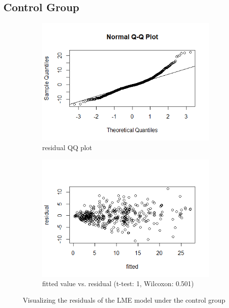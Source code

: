 \subsection{Control Group}
\begin{figure}[H]
\centering
\begin{subfigure}{.4\textwidth}
  \centering
  \includegraphics[width=1\linewidth]{../../plots/qq_residual_control.png}
  \caption{residual QQ plot}
\end{subfigure}
\begin{subfigure}{.4\textwidth}
  \centering
  \includegraphics[width=1\linewidth]{../../plots/residual_control.png}
  \caption{fitted value vs. residual (t-test: 1, Wilcoxon: 0.501)}
\end{subfigure}
\caption{Visualizing the residuals of the LME model under the control group}
\label{fig:residual.control}
\end{figure}

